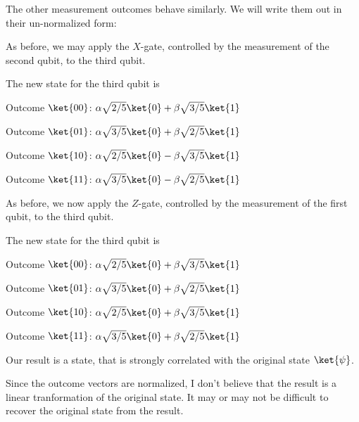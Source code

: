 \documentclass{article}
\begin{document}
\begin{enumerate}
        The other measurement outcomes behave similarly. We will write them out in their un-normalized form:

        As before, we may apply the $X$-gate, controlled by the measurement of the second qubit, to the third qubit.

        The new state for the third qubit is

        Outcome $\ket{00}$: $\alpha\sqrt{2/5}\ket{0}+\beta\sqrt{3/5}\ket{1}$

        Outcome $\ket{01}$: $\alpha\sqrt{3/5}\ket{0}+\beta\sqrt{2/5}\ket{1}$

        Outcome $\ket{10}$: $\alpha\sqrt{2/5}\ket{0}-\beta\sqrt{3/5}\ket{1}$

        Outcome $\ket{11}$: $\alpha\sqrt{3/5}\ket{0}-\beta\sqrt{2/5}\ket{1}$

        As before, we now apply the $Z$-gate, controlled by the measurement of the first qubit, to the third qubit.

        The new state for the third qubit is

        Outcome $\ket{00}$: $\alpha\sqrt{2/5}\ket{0}+\beta\sqrt{3/5}\ket{1}$

        Outcome $\ket{01}$: $\alpha\sqrt{3/5}\ket{0}+\beta\sqrt{2/5}\ket{1}$

        Outcome $\ket{10}$: $\alpha\sqrt{2/5}\ket{0}+\beta\sqrt{3/5}\ket{1}$

        Outcome $\ket{11}$: $\alpha\sqrt{3/5}\ket{0}+\beta\sqrt{2/5}\ket{1}$

        Our result is a state, that is strongly correlated with the original state $\ket{\psi}$.

        Since the outcome vectors are normalized, I don't believe that the result is a linear tranformation
        of the original state. It may or may not be difficult to recover the original state from the result.
\end{enumerate}
\end{document}
